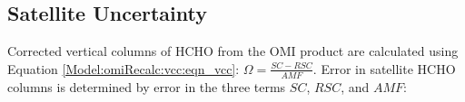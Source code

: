    
    
    
  \subsection{Satellite Uncertainty}
    \label{BioIsop:uncertainty:satellite}
    
    Corrected vertical columns of HCHO from the OMI product are calculated using Equation \ref{Model:omiRecalc:vcc:eqn_vcc}:
    $\Omega = \frac{SC - RSC}{AMF}$.
    Error in satellite HCHO columns is determined by error in the three terms $SC$, $RSC$, and $AMF$:
